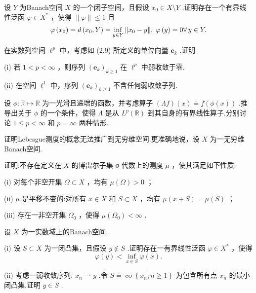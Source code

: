 \begin{rbhw}
设 $Y$ 为Banach空间 $X$ 的一个闭子空间，且假设 ${x}_{0} \in  X \setminus  Y$ .证明存在一个有界线性泛函 $\varphi  \in  {X}^{ * }$ ，使得 $\| \varphi \|  \leq  1$ 且
\[
\varphi \left( {x}_{0}\right)  = d\left( {{x}_{0},Y}\right)  = \mathop{\inf }\limits_{{y \in  Y}}\norm{{x}_{0} - y},\;\varphi \left( y\right)  = 0\forall\,y \in  Y.
\]
\end{rbhw}

\begin{rbhw}
在实数列空间 ${\ell }^{p}$ 中，考虑如 (2.9) 所定义的单位向量 ${\bm{e}}_{k}$ .证明

(i) 若 $1 < p < \infty$ ，则序列 ${\left( {\bm{e}}_{k}\right) }_{k \geq  1}$ 在 ${\ell }^{p}$ 中弱收敛于零.

(ii) 在空间 ${\ell }^{1}$ 中，序列 ${\left( {\bm{e}}_{k}\right) }_{k \geq  1}$ 不含任何弱收敛子列.
\end{rbhw}

\begin{rbhw}
设 $\phi  : \mathbb{R} \mapsto  \mathbb{R}$ 为一光滑且递增的函数，并考虑算子 $\left( {\Lambda f}\right) \left( x\right)  \doteq  f\left( {\phi \left( x\right) }\right)$ .推导出关于 $\phi$ 的一个条件，使得 $\Lambda$ 是从 ${L}^{p}\left( \mathbb{R}\right)$ 到其自身的有界线性算子.分别讨论 $1 \leq  p < \infty$ 和 $p = \infty$ 两种情形.

\end{rbhw}

\begin{rbhw}
证明Lebesgue测度的概念无法推广到无穷维空间.更准确地说，设 $X$ 为一无穷维Banach空间.

证明:不存在定义在 $X$ 的博雷尔子集 σ-代数上的测度 $\mu$ ，使其满足如下性质:

(i) 对每个非空开集 $\Omega  \subset  X$ ，均有 $\mu \left( \Omega \right)  > 0$ ；

(ii) $\mu$ 是平移不变的:对所有 $x \in  X$ 和 $S \subset  X$ ，均有 $\mu \left( {x + S}\right)  = \mu \left( S\right)$ ；

(iii) 存在一非空开集 ${\Omega }_{0}$ ，使得 $\mu \left( {\Omega }_{0}\right)  < \infty$ .
\end{rbhw}

\begin{rbhw}
设 $X$ 为一实数域上的Banach空间.

(i) 设 $S \subset  X$ 为一闭凸集，且假设 $y \notin  S$ .证明存在一有界线性泛函 $\varphi  \in  {X}^{ * }$ ，使得
\[
\varphi \left( y\right)  < \mathop{\inf }\limits_{{x \in  S}}\varphi \left( x\right) .
\]

(ii) 考虑一弱收敛序列: ${x}_{n} \rightharpoonup  y$ .令 $S \doteq  \overline{\operatorname{co}\left\{  {{x}_{n};n \geq  1}\right\}  }$ 为包含所有点 ${x}_{n}$ 的最小闭凸集.证明 $y \in  S$ .
\end{rbhw}


